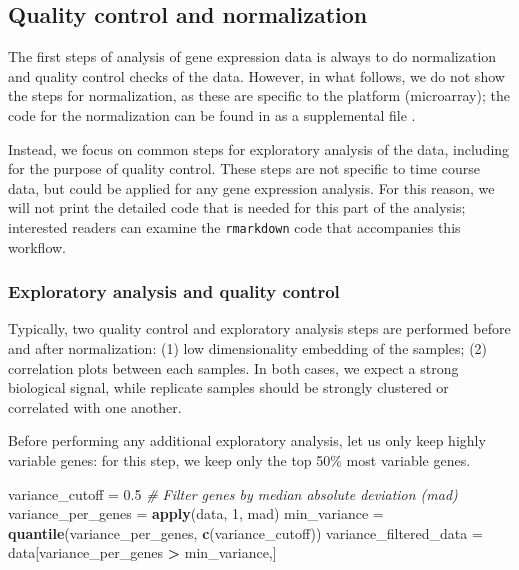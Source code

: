\documentclass[9pt,a4paper,]{extarticle}
\newenvironment{Shaded}{\begin{snugshade}}{\end{snugshade}}
\newcommand{\CommentTok}[1]{\textcolor[rgb]{0.56,0.35,0.01}{\textit{#1}}}
\newcommand{\DecValTok}[1]{\textcolor[rgb]{0.00,0.00,0.81}{#1}}
\newcommand{\FloatTok}[1]{\textcolor[rgb]{0.00,0.00,0.81}{#1}}
\newcommand{\KeywordTok}[1]{\textcolor[rgb]{0.13,0.29,0.53}{\textbf{#1}}}
\newcommand{\NormalTok}[1]{#1}
\newcommand{\OperatorTok}[1]{\textcolor[rgb]{0.81,0.36,0.00}{\textbf{#1}}}
\newcommand{\StringTok}[1]{\textcolor[rgb]{0.31,0.60,0.02}{#1}}
\begin{document}
\hypertarget{quality-control-and-normalization}{%
\subsection{Quality control and normalization}\label{quality-control-and-normalization}}

The first steps of analysis of gene expression data is always to do
normalization and quality control checks of the data. However, in what
follows, we do not show the steps for normalization, as these are specific to
the platform (microarray); the code for the normalization can be found in as a
supplemental file \citep{abrams:protocol, park:evaluation}.

Instead, we focus on common steps for exploratory analysis of the data, including for the purpose of quality control. These steps
are not specific to time course data, but could be applied for any gene expression
analysis. For this reason, we will not print the detailed code that is needed for this part of the analysis; interested readers can examine the \texttt{rmarkdown} code that accompanies this workflow.

\hypertarget{exploratory-analysis-and-quality-control}{%
\subsubsection{Exploratory analysis and quality control}\label{exploratory-analysis-and-quality-control}}

Typically, two quality control and exploratory analysis steps are
performed before and after normalization: (1) low dimensionality embedding of
the samples; (2) correlation plots between each samples. In both cases, we
expect a strong biological signal, while replicate samples should be strongly
clustered or correlated with one another.

Before performing any additional exploratory analysis, let us only keep highly
variable genes: for this step, we keep only the top 50\% most variable genes.

\begin{Shaded}
\begin{Highlighting}[]
\NormalTok{variance_cutoff =}\StringTok{ }\FloatTok{0.5}
\CommentTok{# Filter genes by median absolute deviation (mad)}
\NormalTok{variance_per_genes =}\StringTok{ }\KeywordTok{apply}\NormalTok{(data, }\DecValTok{1}\NormalTok{, mad)}
\NormalTok{min_variance =}\StringTok{ }\KeywordTok{quantile}\NormalTok{(variance_per_genes, }\KeywordTok{c}\NormalTok{(variance_cutoff))}
\NormalTok{variance_filtered_data =}\StringTok{ }\NormalTok{data[variance_per_genes }\OperatorTok{>}\StringTok{ }\NormalTok{min_variance,]}
\end{Highlighting}
\end{Shaded}
\end{document}
